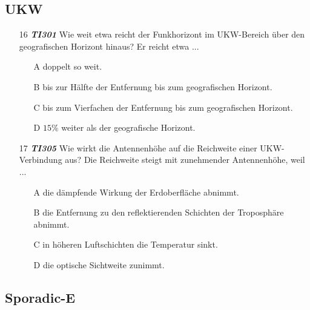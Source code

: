 \subsection*{UKW}

\begin{enumerate} 
\itemsep1pt\parskip0pt
\item[16] \emph{\textbf{TI301}}   Wie weit etwa reicht der Funkhorizont im UKW-Bereich über den geografischen Horizont hinaus? Er reicht etwa ...
	\begin{enumerate}
	\itemsep1pt\parskip0pt
		\item[A] doppelt so weit.
		\item[B] bis zur Hälfte der Entfernung bis zum geografischen Horizont.
		\item[C] bis zum Vierfachen der Entfernung bis zum geografischen Horizont.
		\item[D] $15 \%$ weiter als der geografische Horizont.
	\end{enumerate}
\end{enumerate}

\begin{enumerate} 
\itemsep1pt\parskip0pt
\item[17] \emph{\textbf{TI305}}   Wie wirkt die Antennenhöhe auf die Reichweite einer UKW-Verbindung aus? Die Reichweite steigt mit zunehmender Antennenhöhe, weil ...
	\begin{enumerate}
	\itemsep1pt\parskip0pt
		\item[A] die dämpfende Wirkung der Erdoberfläche abnimmt.
		\item[B] die Entfernung zu den reflektierenden Schichten der Troposphäre abnimmt.
		\item[C] in höheren Luftschichten die Temperatur sinkt.
		\item[D] die optische Sichtweite zunimmt.
	\end{enumerate}
\end{enumerate}

\subsection*{Sporadic-E}


